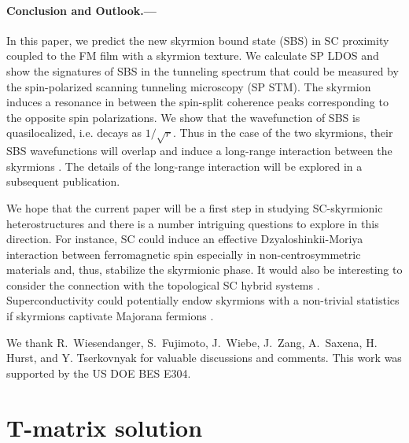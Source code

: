 \documentclass[twocolumn,showpacs,floatfix,longbibliography]{revtex4-1}
\begin{document}
\paragraph*{Conclusion and Outlook.---} \label{sec:conclusion}

In this paper, we predict the new skyrmion bound state (SBS) in SC proximity coupled to the FM film with a skyrmion texture. We calculate SP LDOS and show the signatures of SBS in the tunneling spectrum that could be measured by the spin-polarized scanning tunneling microscopy (SP STM). The skyrmion induces a resonance in between the spin-split coherence peaks corresponding to the opposite spin polarizations. We show that the wavefunction of SBS is quasilocalized, i.e. decays as $1/\sqrt{r}$. Thus in the case of the two skyrmions, their SBS wavefunctions will overlap and induce a long-range interaction between the skyrmions \cite{Yao2014,Menard2015}. The details of the long-range interaction will be explored in a subsequent publication.

We hope that the current paper will be a first step in studying SC-skyrmionic heterostructures and there is a number intriguing questions to explore in this direction. For instance, SC could induce an effective Dzyaloshinkii-Moriya interaction between ferromagnetic spin especially in non-centrosymmetric materials and, thus, stabilize the skyrmionic phase. It would also be interesting to consider the connection with the topological SC hybrid systems \cite{Alicea2012}. Superconductivity could potentially endow skyrmions with a non-trivial statistics if skyrmions captivate Majorana fermions \cite{Kim2015}.

We thank  R.~Wiesendanger, S.~Fujimoto, J.~Wiebe, J.~Zang, A.~Saxena, H. Hurst, and Y. Tserkovnyak for valuable discussions and comments. This work was supported by the US DOE BES E304.

\newpage




\appendix

\section{T-matrix solution} \label{sec:appendixTMatrix}
\end{document}
